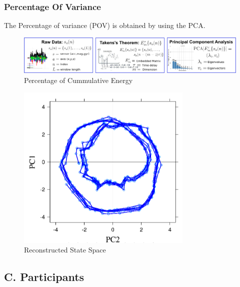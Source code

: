 \documentclass{beamer}
\begin{document}
\begin{frame}
\frametitle{Percentage Of Variance}
\vspace{-0.7cm}

The Percentage of variance (POV) is obtained by using the PCA.
\begin{figure}[!htb]
\centering
\includegraphics[width=1\textwidth]{method_diagram03}
\caption[PA]{Percentage of Cummulative Energy}
 \label{fig:sn}
\end{figure}

\vspace{-0.7cm}

\begin{figure}[!htb]
\centering
\includegraphics[width=.35\textwidth]{rss00}
\caption[PA]{Reconstructed State Space}
 \label{fig:sn}
\end{figure}


\end{frame}









\subsection{C. Participants}
\end{document}
